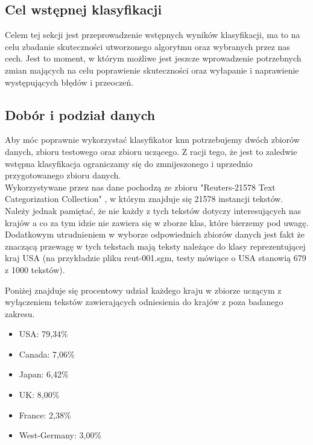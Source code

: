 \documentclass{article}
\begin{document}
\subsection*{Cel wstępnej klasyfikacji}

Celem tej sekcji jest przeprowadzenie wstępnych wyników klasyfikacji, ma to na celu zbadanie skuteczności utworzonego algorytmu oraz wybranych przez nas cech. Jest to moment, w którym możliwe jest jeszcze wprowadzenie potrzebnych zmian mających na celu poprawienie skuteczności oraz wyłapanie i naprawienie występujących błędów i przeoczeń.

\subsection*{Dobór i podział danych}

Aby móc poprawnie wykorzystać klasyfikator knn potrzebujemy dwóch zbiorów danych, zbioru testowego oraz zbioru uczącego. Z racji tego, że jest to zaledwie wstępna klasyfikacja ograniczamy się do zmnijeszonego i uprzednio przygotowanego zbioru danych. \\

\noindent Wykorzystywane przez nas dane pochodzą ze zbioru "Reuters-21578 Text Categorization Collection" , w którym znajduje się 21578 instancji tekstów. Należy jednak pamiętać, że nie każdy z tych tekstów dotyczy interesujących nas krajów a co za tym idzie nie zawiera się w zborze klas, które bierzemy pod uwagę. Dodatkowym utrudnieniem w wyborze odpowiednich zbiorów danych jest fakt że znaczącą przewagę w tych tekstach mają teksty należące do klasy reprezentującej kraj USA (na przykładzie pliku reut-001.sgm, testy mówiące o USA stanowią 679 z 1000 tekstów). \\

\newpage

\noindent Poniżej znajduje się procentowy udział każdego kraju w zbiorze uczącym z wyłączeniem tekstów zawierających odniesienia do krajów z poza badanego zakresu.

\begin{itemize}
    \item USA: 79,34\%
    \item Canada: 7,06\%
    \item Japan: 6,42\%
    \item UK: 8,00\%
    \item France: 2,38\%
    \item West-Germany: 3,00\%
\end{itemize}
\end{document}
